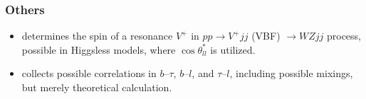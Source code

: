 \documentclass[10pt,a4paper]{article}
\begin{document}


\subsubsection{Others}
\begin{itemize}
 \item \cite{Alves:2008up} determines the spin of a resonance $V^+$ in $pp\to V^+jj$ (VBF) $\to WZjj$ process, possible in Higgsless models, where $\cos\theta^*_{ll}$ is utilized.
 \item \cite{Graesser:2008qi} collects possible correlations in $b$--$\tau$, $b$--$l$, and $\tau$--$l$, including possible mixings, but merely theoretical calculation.
\end{itemize}






\end{document}
